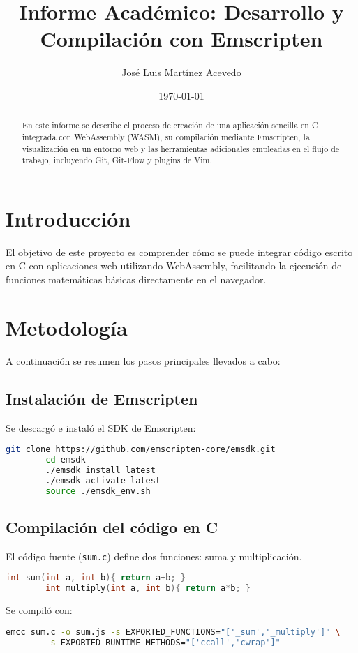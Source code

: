 \documentclass[12pt,a4paper]{article}
\title{Informe Académico: Desarrollo y Compilación con Emscripten}
\author{José Luis Martínez Acevedo}
\date{\today}
\begin{document}
	
	\maketitle
	
	\begin{abstract}
		En este informe se describe el proceso de creación de una aplicación sencilla en C integrada con WebAssembly (WASM), su compilación mediante Emscripten, la visualización en un entorno web y las herramientas adicionales empleadas en el flujo de trabajo, incluyendo Git, Git-Flow y plugins de Vim. 
	\end{abstract}
	
	\section{Introducción}
	El objetivo de este proyecto es comprender cómo se puede integrar código escrito en C con aplicaciones web utilizando WebAssembly, facilitando la ejecución de funciones matemáticas básicas directamente en el navegador.
	
	\section{Metodología}
	A continuación se resumen los pasos principales llevados a cabo:
	
	\subsection{Instalación de Emscripten}
	Se descargó e instaló el SDK de Emscripten:
	\begin{lstlisting}[language=bash]
		git clone https://github.com/emscripten-core/emsdk.git
		cd emsdk
		./emsdk install latest
		./emsdk activate latest
		source ./emsdk_env.sh
	\end{lstlisting}
	
	\subsection{Compilación del código en C}
	El código fuente (\texttt{sum.c}) define dos funciones: suma y multiplicación.
	\begin{lstlisting}[language=C]
		int sum(int a, int b){ return a+b; }
		int multiply(int a, int b){ return a*b; }
	\end{lstlisting}
	
	Se compiló con:
	\begin{lstlisting}[language=bash]
		emcc sum.c -o sum.js -s EXPORTED_FUNCTIONS="['_sum','_multiply']" \
		-s EXPORTED_RUNTIME_METHODS="['ccall','cwrap']"
	\end{lstlisting}
	
\end{document}

